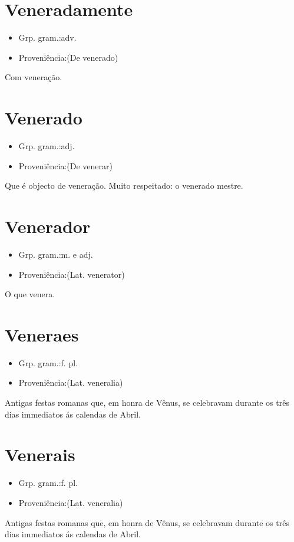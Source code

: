 \documentclass{article}
\begin{document}
\section{Veneradamente}
\begin{itemize}
\item {Grp. gram.:adv.}
\end{itemize}
\begin{itemize}
\item {Proveniência:(De \textunderscore venerado\textunderscore )}
\end{itemize}
Com veneração.
\section{Venerado}
\begin{itemize}
\item {Grp. gram.:adj.}
\end{itemize}
\begin{itemize}
\item {Proveniência:(De \textunderscore venerar\textunderscore )}
\end{itemize}
Que é objecto de veneração.
Muito respeitado: \textunderscore o venerado mestre\textunderscore .
\section{Venerador}
\begin{itemize}
\item {Grp. gram.:m.  e  adj.}
\end{itemize}
\begin{itemize}
\item {Proveniência:(Lat. \textunderscore venerator\textunderscore )}
\end{itemize}
O que venera.
\section{Veneraes}
\begin{itemize}
\item {Grp. gram.:f. pl.}
\end{itemize}
\begin{itemize}
\item {Proveniência:(Lat. \textunderscore veneralia\textunderscore )}
\end{itemize}
Antigas festas romanas que, em honra de Vênus, se celebravam durante os três dias immediatos ás calendas de Abril.
\section{Venerais}
\begin{itemize}
\item {Grp. gram.:f. pl.}
\end{itemize}
\begin{itemize}
\item {Proveniência:(Lat. \textunderscore veneralia\textunderscore )}
\end{itemize}
Antigas festas romanas que, em honra de Vênus, se celebravam durante os três dias immediatos ás calendas de Abril.
\end{document}
